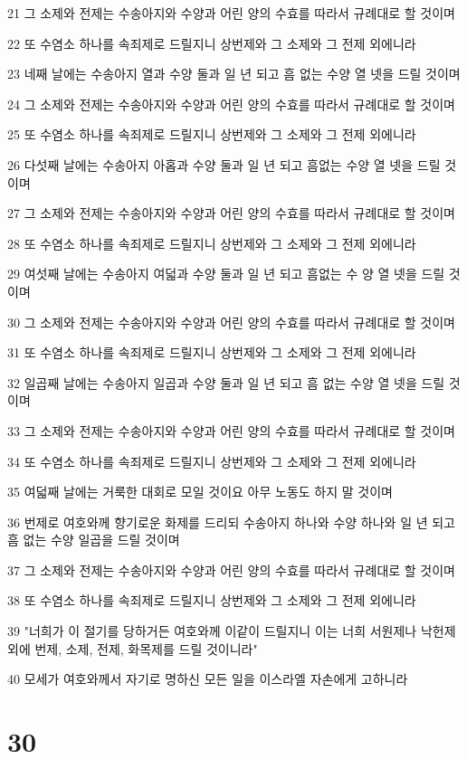 \par 21 그 소제와 전제는 수송아지와 수양과 어린 양의 수효를 따라서 규례대로 할 것이며
\par 22 또 수염소 하나를 속죄제로 드릴지니 상번제와 그 소제와 그 전제 외에니라
\par 23 네째 날에는 수송아지 열과 수양 둘과 일 년 되고 흠 없는 수양 열 넷을 드릴 것이며
\par 24 그 소제와 전제는 수송아지와 수양과 어린 양의 수효를 따라서 규례대로 할 것이며
\par 25 또 수염소 하나를 속죄제로 드릴지니 상번제와 그 소제와 그 전제 외에니라
\par 26 다섯째 날에는 수송아지 아홉과 수양 둘과 일 년 되고 흠없는 수양 열 넷을 드릴 것이며
\par 27 그 소제와 전제는 수송아지와 수양과 어린 양의 수효를 따라서 규례대로 할 것이며
\par 28 또 수염소 하나를 속죄제로 드릴지니 상번제와 그 소제와 그 전제 외에니라
\par 29 여섯째 날에는 수송아지 여덟과 수양 둘과 일 년 되고 흠없는 수 양 열 넷을 드릴 것이며
\par 30 그 소제와 전제는 수송아지와 수양과 어린 양의 수효를 따라서 규례대로 할 것이며
\par 31 또 수염소 하나를 속죄제로 드릴지니 상번제와 그 소제와 그 전제 외에니라
\par 32 일곱째 날에는 수송아지 일곱과 수양 둘과 일 년 되고 흠 없는 수양 열 넷을 드릴 것이며
\par 33 그 소제와 전제는 수송아지와 수양과 어린 양의 수효를 따라서 규례대로 할 것이며
\par 34 또 수염소 하나를 속죄제로 드릴지니 상번제와 그 소제와 그 전제 외에니라
\par 35 여덟째 날에는 거룩한 대회로 모일 것이요 아무 노동도 하지 말 것이며
\par 36 번제로 여호와께 향기로운 화제를 드리되 수송아지 하나와 수양 하나와 일 년 되고 흠 없는 수양 일곱을 드릴 것이며
\par 37 그 소제와 전제는 수송아지와 수양과 어린 양의 수효를 따라서 규례대로 할 것이며
\par 38 또 수염소 하나를 속죄제로 드릴지니 상번제와 그 소제와 그 전제 외에니라
\par 39 "너희가 이 절기를 당하거든 여호와께 이같이 드릴지니 이는 너희 서원제나 낙헌제외에 번제, 소제, 전제, 화목제를 드릴 것이니라"
\par 40 모세가 여호와께서 자기로 명하신 모든 일을 이스라엘 자손에게 고하니라

\chapter{30}

